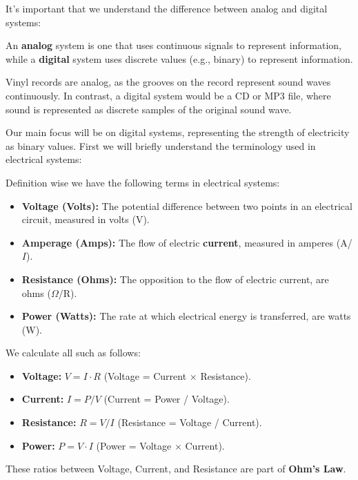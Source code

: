 \newpage 

\noindent
It's important that we understand the difference between analog and digital systems:
\begin{Def}

    \label{def:analog_digital}

    An \textbf{analog} system is one that uses continuous signals to represent information, while a \textbf{digital} system uses discrete values (e.g., binary) to represent information.
\end{Def}

\begin{Example}

    \noindent
    Vinyl records are analog, as the grooves on the record represent sound waves continuously. 
    In contrast, a digital system would be a CD or MP3 file, where sound is represented as discrete samples of the original sound wave.
\end{Example}

\noindent
Our main focus will be on digital systems, representing the strength of electricity as binary values.
First we will briefly understand the terminology used in electrical systems:
\begin{Def}

    \label{def:voltage_amps_watts}

    Definition wise we have the following terms in electrical systems:
    \begin{itemize}
        \item \textbf{Voltage (Volts):} The potential difference between two points in an electrical circuit, measured in volts (V).
        \item \textbf{Amperage (Amps):} The flow of electric \textbf{current}, measured in amperes (A/$I$).
        \item \textbf{Resistance (Ohms):} The opposition to the flow of electric current, are ohms ($\Omega$/R).
        \item \textbf{Power (Watts):} The rate at which electrical energy is transferred, are watts (W).
    \end{itemize}

    \noindent
    We calculate all such as follows:
    \begin{itemize}
        \item \textbf{Voltage:} $V = I \cdot R$ (Voltage = Current $\times$ Resistance).
        \item \textbf{Current:} $I = P / V$ (Current = Power / Voltage).
        \item \textbf{Resistance:} $R = V / I$ (Resistance = Voltage / Current).
        \item \textbf{Power:} $P = V \cdot I$ (Power = Voltage $\times$ Current).
    \end{itemize}

    \noindent
    These ratios between Voltage, Current, and Resistance are part of \textbf{Ohm's Law}.
\end{Def}

